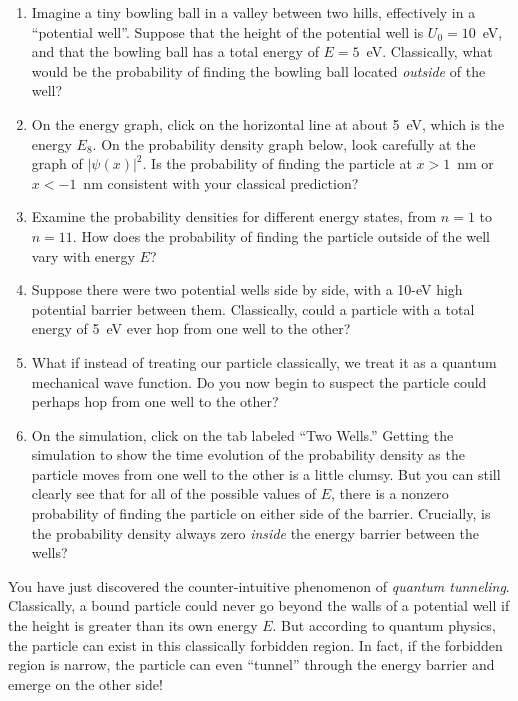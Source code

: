 \begin{enumerate}[wide]

\item Imagine a tiny bowling ball in a valley between two hills, effectively in a ``potential well''.  Suppose that the height of the potential well is $U_0 = 10$~eV, and that the bowling ball has a total energy of $E = 5$~eV.  Classically, what would be the probability of finding the bowling ball located \textit{outside} of the well?
\answerspace{0.6in}

\item On the energy graph, click on the horizontal line at about 5~eV, which is the energy $E_8$.  On the probability density graph below, look carefully at the graph of $\left| \psi(x) \right|^2$.  Is the probability of finding the particle at $x>1$~nm or $x < -1$~nm consistent with your classical prediction?  
\answerspace{0.6in}

\item Examine the probability densities for different energy states, from $n=1$ to $n=11$.  How does the probability of finding the particle outside of the well vary with energy $E$?
\answerspace{0.6in}


\item Suppose there were two potential wells side by side, with a 10-eV high potential barrier between them.  Classically, could a particle with a total energy of 5~eV ever hop from one well to the other?
\answerspace{0.6in}

\item What if instead of treating our particle classically, we treat it as a quantum mechanical wave function.  Do you now begin to suspect the particle could perhaps hop from one well to the other?
\answerspace{0.6in}

\item On the simulation, click on the tab labeled ``Two Wells.''  Getting the simulation to show the time evolution of the probability density as the particle moves from one well to the other is a little clumsy.  But you can still clearly see that for all of the possible values of $E$, there is a nonzero probability of finding the particle on either side of the barrier.  Crucially, is the probability density always zero \textit{inside} the energy barrier between the wells?
\answerspace{0.6in}

\end{enumerate}


You have just discovered the counter-intuitive phenomenon of \textit{quantum tunneling}.  Classically, a bound particle could never go beyond the walls of a potential well if the height is greater than its own energy $E$.  But according to quantum physics, the particle can exist in this classically forbidden region.  In fact, if the forbidden region is narrow, the particle can even ``tunnel'' through the energy barrier and emerge on the other side!

